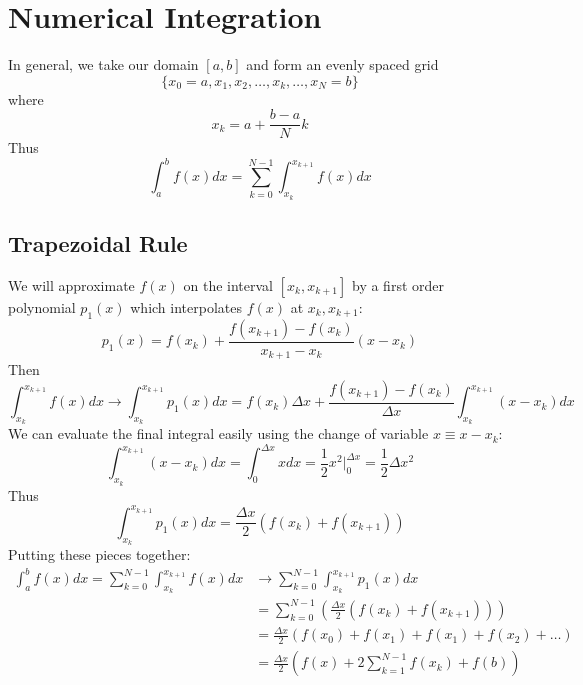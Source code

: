\documentclass[12pt]{article}
\theoremstyle{definition}
\theoremstyle{definition}
\begin{document}
\section{Numerical Integration}

In general, we take our domain $[a,b]$ and form an evenly spaced grid
\begin{equation}
	\{x_0=a, x_1, x_2, \ldots, x_k, \ldots, x_N=b\}
\end{equation} 
where
\begin{equation}
	x_k = a + \frac{b-a}{N}k
\end{equation}
Thus
\begin{equation}
	\int_a^b f(x)dx = \sum_{k=0}^{N-1} \int_{x_k}^{x_{k+1}} f(x) dx
\end{equation}

\subsection{Trapezoidal Rule}
We will approximate $f(x)$ on the interval $[x_k,x_{k+1}]$ by a first order polynomial $p_1(x)$ which interpolates $f(x)$ at $x_k, x_{k+1}$:
\begin{equation}
	p_1(x) = f(x_k) + \frac{f(x_{k+1}) - f(x_k)}{x_{k+1} - x_k} (x - x_k)
\end{equation}
Then
\begin{equation}
	\int_{x_k}^{x_{k+1}} f(x) dx \to \int_{x_k}^{x_{k+1}} p_1(x)dx = f(x_k) \Delta x + \frac{f(x_{k+1}) - f(x_k)}{\Delta x} \int_{x_k}^{x_{k+1}} (x-x_k) dx
\end{equation}
We can evaluate the final integral easily using the change of variable $x \equiv x - x_k$:
\begin{equation}
	\int_{x_k}^{x_{k+1}} (x-x_k) dx = \int_{0}^{\Delta x} x dx = \frac{1}{2}x^2 \bigg\rvert_0^{\Delta x} = \frac{1}{2}\Delta x^2
\end{equation}
Thus 
\begin{equation}
	\int_{x_k}^{x_{k+1}} p_1(x)dx = \frac{\Delta x}{2} (f(x_k) + f(x_{k+1}))
\end{equation}
Putting these pieces together:
\begin{align*}
	\int_a^b f(x)dx = \sum_{k=0}^{N-1} \int_{x_k}^{x_{k+1}} f(x) dx &\to \sum_{k=0}^{N-1} \int_{x_k}^{x_{k+1}} p_1(x)dx \\
	&= \sum_{k=0}^{N-1} \left(\frac{\Delta x}{2} (f(x_k) + f(x_{k+1})) \right) \\
	&= \frac{\Delta x}{2} (f(x_0) + f(x_1) + f(x_1) + f(x_2) + \ldots ) \\
	&= \frac{\Delta x}{2} (f(x) + 2 \sum_{k=1}^{N-1} f(x_k) + f(b))
\end{align*}
\end{document}

